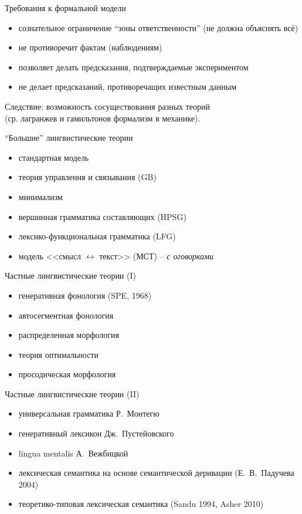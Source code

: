 \documentclass{beamer}
\begin{document}
\begin{frame}{Требования к формальной модели}
\begin{itemize}
	\item сознательное ограничение ``зоны ответственности'' (не должна объяснять всё)
	\item не противоречит фактам (наблюдениям)
	\item позволяет делать предсказания, подтверждаемые экспериментом
	\item не делает предсказаний, противоречащих известным данным
\end{itemize}
\bigskip
Следствие: возможность сосуществования разных теорий\\ (ср. лагранжев и гамильтонов формализм в механике).
\end{frame}

\begin{frame}{``Большие'' лингвистические теории}
\begin{itemize}
	\item стандартная модель
	\item теория управления и связывания (GB)
	\item минимализм
	\item вершинная грамматика составляющих (HPSG)
	\item лексико-функциональная грамматика (LFG)
	\item модель <<смысл $\leftrightarrow$ текст>> (МСТ) -- \textit{с оговорками}
\end{itemize}
\end{frame}

\begin{frame}{Частные лингвистические теории (I)}
\begin{itemize}
	\item генеративная фонология (SPE, 1968)
	\item автосегментная фонология
	\item распределенная морфология
	\item теория оптимальности
	\item просодическая морфология
\end{itemize}
\end{frame}

\begin{frame}{Частные лингвистические теории (II)}
\begin{itemize}
	\item универсальная грамматика Р.~Монтегю
	\item генеративный лексикон Дж.~Пустейовского
	\item lingua mentalis А.~Вежбицкой
	\item лексическая семантика на основе семантической деривации (Е.~В.~Падучева 2004)
	\item теоретико-типовая лексическая семантика (Sandu 1994, Asher 2010)
\end{itemize}
\end{frame}
\end{document}
